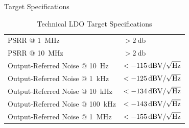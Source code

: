\documentclass[10pt, aspectratio=169]{beamer}
\begin{document}
\begin{frame}{Target Specifications}
\begin{table}[htbp]
\begin{tabularx}{0.5\textwidth}{@{}Xl@{}}
            PSRR @ \qty{1}{\mega\hertz} & $>\qty{2}{\decibel}$ \\
            PSRR @ \qty{10}{\mega\hertz} & $>\qty{2}{\decibel}$ \\
            \midrule
            Output-Referred Noise @ \qty{10}{\hertz} & $<-\qty{115}{\decibel\volt\slash\sqrt{\Hz}}$ \\
            Output-Referred Noise @ \qty{1}{\kilo\hertz} & $<-\qty{125}{\decibel\volt\slash\sqrt{\Hz}}$ \\
            Output-Referred Noise @ \qty{10}{\kilo\hertz} & $<-\qty{134}{\decibel\volt\slash\sqrt{\Hz}}$ \\
            Output-Referred Noise @ \qty{100}{\kilo\hertz} & $<-\qty{143}{\decibel\volt\slash\sqrt{\Hz}}$ \\
            Output-Referred Noise @ \qty{1}{\mega\hertz} & $<-\qty{155}{\decibel\volt\slash\sqrt{\Hz}}$ \\
            \bottomrule
        \end{tabularx}
        \caption{Technical LDO Target Specifications}
    \end{table}
\end{frame}
\end{document}
